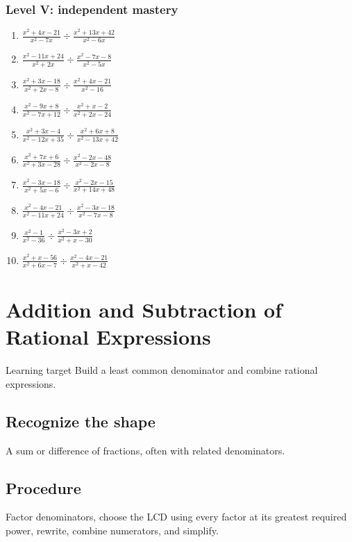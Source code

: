 \documentclass[11pt,oneside]{book}
\begin{document}
\subsection*{Level V: independent mastery}
\begin{enumerate}[leftmargin=*,label=\textbf{\arabic*.},itemsep=0.65\baselineskip]
\item $\displaystyle \frac{x^{2} + 4 x - 21}{x^{2} - 7 x}\div\frac{x^{2} + 13 x + 42}{x^{2} - 6 x}$
\item $\displaystyle \frac{x^{2} - 11 x + 24}{x^{2} + 2 x}\div\frac{x^{2} - 7 x - 8}{x^{2} - 5 x}$
\item $\displaystyle \frac{x^{2} + 3 x - 18}{x^{2} + 2 x - 8}\div\frac{x^{2} + 4 x - 21}{x^{2} - 16}$
\item $\displaystyle \frac{x^{2} - 9 x + 8}{x^{2} - 7 x + 12}\div\frac{x^{2} + x - 2}{x^{2} + 2 x - 24}$
\item $\displaystyle \frac{x^{2} + 3 x - 4}{x^{2} - 12 x + 35}\div\frac{x^{2} + 6 x + 8}{x^{2} - 13 x + 42}$
\item $\displaystyle \frac{x^{2} + 7 x + 6}{x^{2} + 3 x - 28}\div\frac{x^{2} - 2 x - 48}{x^{2} - 2 x - 8}$
\item $\displaystyle \frac{x^{2} - 3 x - 18}{x^{2} + 5 x - 6}\div\frac{x^{2} - 2 x - 15}{x^{2} + 14 x + 48}$
\item $\displaystyle \frac{x^{2} - 4 x - 21}{x^{2} - 11 x + 24}\div\frac{x^{2} - 3 x - 18}{x^{2} - 7 x - 8}$
\item $\displaystyle \frac{x^{2} - 1}{x^{2} - 36}\div\frac{x^{2} - 3 x + 2}{x^{2} + x - 30}$
\item $\displaystyle \frac{x^{2} + x - 56}{x^{2} + 6 x - 7}\div\frac{x^{2} - 4 x - 21}{x^{2} + x - 42}$
\end{enumerate}
\chapter{Addition and Subtraction of Rational Expressions}
\begin{rulebox}{Learning target}
Build a least common denominator and combine rational expressions.
\end{rulebox}
\section{Recognize the shape}
A sum or difference of fractions, often with related denominators.
\section{Procedure}
Factor denominators, choose the LCD using every factor at its greatest required power, rewrite, combine numerators, and simplify.
\end{document}
